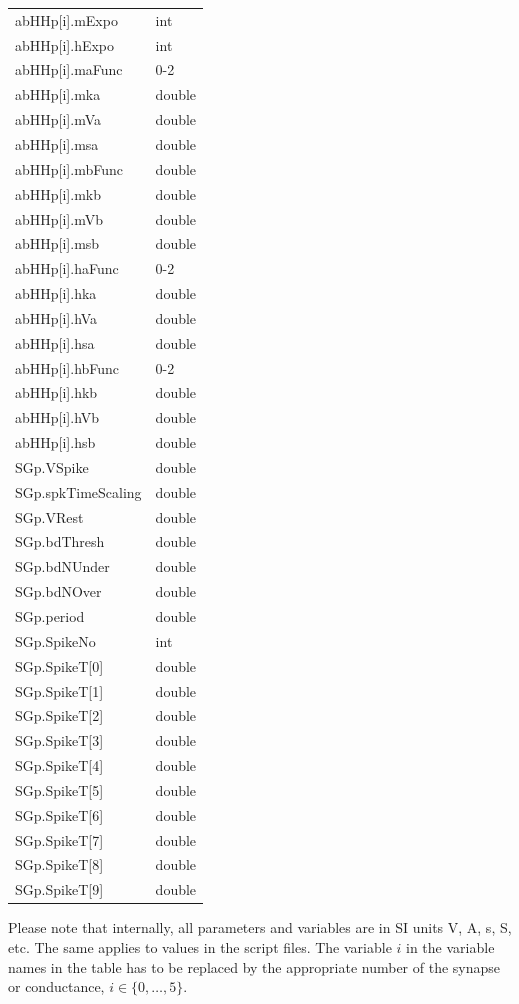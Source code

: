 \documentclass{article}
\begin{document}
\begin{table}
\begin{tabular}[t]{|ll|}
abHHp[i].mExpo & int \\
abHHp[i].hExpo & int \\
abHHp[i].maFunc & 0-2 \\
abHHp[i].mka & double \\
abHHp[i].mVa & double \\
abHHp[i].msa & double \\
abHHp[i].mbFunc & double \\
abHHp[i].mkb & double \\
abHHp[i].mVb & double \\
abHHp[i].msb & double \\
abHHp[i].haFunc & 0-2 \\
abHHp[i].hka & double \\
abHHp[i].hVa & double \\
abHHp[i].hsa & double \\
abHHp[i].hbFunc & 0-2 \\
abHHp[i].hkb & double \\
abHHp[i].hVb & double \\
abHHp[i].hsb & double \\
SGp.VSpike & double \\
SGp.spkTimeScaling & double \\
SGp.VRest & double \\
SGp.bdThresh & double \\
SGp.bdNUnder & double \\
SGp.bdNOver & double \\
SGp.period & double \\ 
SGp.SpikeNo & int \\
SGp.SpikeT[0] & double \\
SGp.SpikeT[1] & double \\
SGp.SpikeT[2] & double \\
SGp.SpikeT[3] & double \\
SGp.SpikeT[4] & double \\
SGp.SpikeT[5] & double \\
SGp.SpikeT[6] & double \\
SGp.SpikeT[7] & double \\
SGp.SpikeT[8] & double \\
SGp.SpikeT[9] & double \\ \hline
\end{tabular}
\end{table}

Please note that internally, all parameters and variables are in SI
units V, A, s, S, etc. The same applies to values in the script files. The
variable $i$ in the variable names in the table has to be replaced by the
appropriate number of the synapse or conductance, $i \in \{0, \ldots,
5\}$. 
\end{document}
